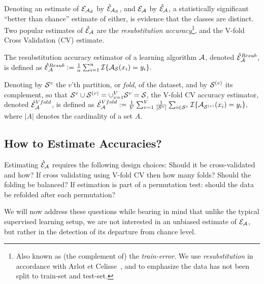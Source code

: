 \documentclass[]{bio}
\begin{document}
Denoting an estimate of $\mathcal{E}_{\mathcal{A}_{\mathcal{S}}}$ by $\hat{\mathcal{E}}_{\mathcal{A}_{\mathcal{S}}}$, and $\mathcal{E}_{\mathcal{A}}$ by $\hat{\mathcal{E}}_{\mathcal{A}}$, a statistically significant ``better than chance'' estimate of either, is evidence that the classes are distinct. 
Two popular estimates of $\hat{\mathcal{E}}_{\mathcal{A}}$ are the \emph{resubstitution accuracy}\footnote{Also known as (the complement of) the \emph{train-error}. We use \emph{resubstitution} in accordance with Arlot et Celisse~\cite{arlot_survey_2010}, and to emphasize the data has not been split to train-set and test-set.}, and the V-fold Cross Validation (CV) estimate.
\begin{definition}
	\label{def:resubstitution}
	The resubstitution accuracy estimator of a learning algorithm $\mathcal{A}$, denoted $\hat{\mathcal{E}}_{\mathcal{A}}^{Resub}$,  is defined as
	$\hat{\mathcal{E}}_{\mathcal{A}}^{Resub} := \frac 1n \sum_{i=1}^{n} \mathcal{I}{\{ \mathcal{A}_{\mathcal{S}}(x_i)=y_i \}}.$
\end{definition}


\begin{definition}
	\label{def:v-fold}
	Denoting by $\mathcal{S}^{v}$ the $v$'th partition, or \emph{fold}, of the dataset, and by $\mathcal{S}^{(v)}$ its complement, so that $\mathcal{S}^{v} \cup \mathcal{S}^{(v)}=\cup_{v=1}^V \mathcal{S}^{v}=\mathcal{S}$, the V-fold CV accuracy estimator, denoted $\hat{\mathcal{E}}_{\mathcal{A}}^{Vfold}$, is defined as 	
	$\hat{\mathcal{E}}_{\mathcal{A}}^{Vfold} := 
	\frac 1V \sum_{v=1}^{V} \frac{1}{|\mathcal{S}^v|} \sum_{i \in \mathcal{S}^{v}} \mathcal{I}{\{ \mathcal{A}_{\mathcal{S}^{(v)}}(x_i)=y_i \}},$
	where $|A|$ denotes the cardinality of a set $A$.
\end{definition}




\subsection{How to Estimate Accuracies?}
\label{sec:considerations}

Estimating $\hat{\mathcal{E}}_{\mathcal{A}}$ requires the following design choices: 
Should it be cross-validated and how? 
If cross validating using V-fold CV then how many folds? 
Should the folding be balanced?
If estimation is part of a permutation test: should the data be refolded after each permutation? 

We will now address these questions while bearing in mind that unlike the typical supervised learning setup, we are not interested in an unbiased estimate of $\mathcal{E}_{\mathcal{A}}$, but rather in the detection of its departure from chance level. 
\end{document}
